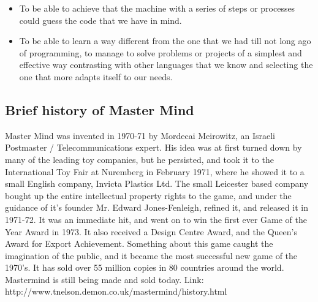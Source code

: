 \documentclass[12pt,letterpaper]{article}
\begin{document}
\begin{itemize}
\item To be able to achieve that the machine with a series of steps or processes could guess the code that we have in mind.

\item To be able to learn a way different from the one that we had till not long ago of programming, to manage to solve problems or projects of a simplest and effective way contrasting with other languages that we know and selecting the one that more adapts itself to our needs.
\end{itemize}

\subsection{Brief history of Master Mind}
\begin{raggedleft}
Master Mind was invented in 1970-71 by Mordecai Meirowitz, an Israeli Postmaster / Telecommunications expert. His idea was at first turned down by many of the leading toy companies, but he persisted, and took it to the International Toy Fair at Nuremberg in February 1971, where he showed it to a small English company, Invicta Plastics Ltd. The small Leicester based company bought up the entire intellectual property rights to the game, and under the guidance of it's founder Mr. Edward Jones-Fenleigh, refined it, and released it in 1971-72. It was an immediate hit, and went on to win the first ever Game of the Year Award in 1973. It also received a Design Centre Award, and the Queen's Award for Export Achievement. Something about this game caught the imagination of the public, and it became the most successful new game of the 1970's. It has sold over 55 million copies in 80 countries around the world. Mastermind is still being made and sold today.
\newline\newline
Link: http://www.tnelson.demon.co.uk/mastermind/history.html
\end{raggedleft}

\newpage
\end{document}
